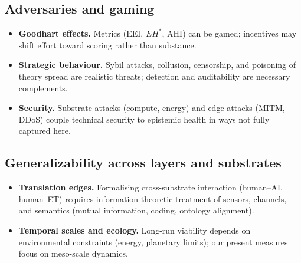 \documentclass[12pt]{article}
\begin{document}
\subsection{Adversaries and gaming}
\begin{itemize}[leftmargin=1.2em]
\item \textbf{Goodhart effects.} Metrics (EEI, $EH^{\ast}$, AHI) can be gamed; incentives may shift effort toward scoring rather than substance.
\item \textbf{Strategic behaviour.} Sybil attacks, collusion, censorship, and poisoning of theory spread are realistic threats; detection and auditability are necessary complements.
\item \textbf{Security.} Substrate attacks (compute, energy) and edge attacks (MITM, DDoS) couple technical security to epistemic health in ways not fully captured here.
\end{itemize}

\subsection{Generalizability across layers and substrates}
\begin{itemize}[leftmargin=1.2em]
\item \textbf{Translation edges.} Formalising cross-substrate interaction (human--AI, human--ET) requires information-theoretic treatment of sensors, channels, and semantics (mutual information, coding, ontology alignment).
\item \textbf{Temporal scales and ecology.} Long-run viability depends on environmental constraints (energy, planetary limits); our present measures focus on meso-scale dynamics.
\end{itemize}
\end{document}
